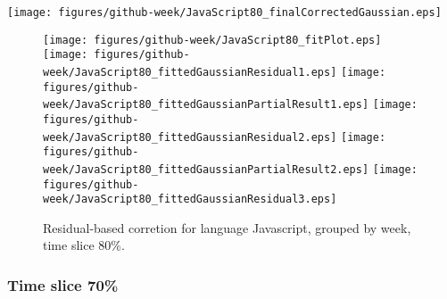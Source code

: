 \begin{center}
{\texttt{[image: figures/github-week/JavaScript80\_finalCorrectedGaussian.eps]}}
\end{center}

\FloatBarrier

\begin{figure}[t]
\centering
{}
{\texttt{[image: figures/github-week/JavaScript80\_fitPlot.eps]}}
{\texttt{[image: figures/github-week/JavaScript80\_fittedGaussianResidual1.eps]}}
{\texttt{[image: figures/github-week/JavaScript80\_fittedGaussianPartialResult1.eps]}}
{\texttt{[image: figures/github-week/JavaScript80\_fittedGaussianResidual2.eps]}}
{\texttt{[image: figures/github-week/JavaScript80\_fittedGaussianPartialResult2.eps]}}
{\texttt{[image: figures/github-week/JavaScript80\_fittedGaussianResidual3.eps]}}
\caption{Residual-based corretion for language Javascript, grouped by week, time slice 80\%.}
\end{figure}


\FloatBarrier


\subsubsection{Time slice 70\%}

